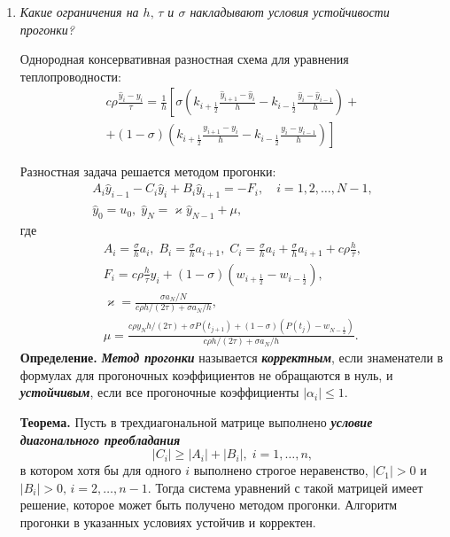 \documentclass[12pt, a4paper]{article}
\begin{document}
\begin{enumerate}

		
		\item \textit{Какие ограничения на $h,\,\tau$ и $\sigma$ накладывают условия устойчивости прогонки?}
		\smallskip
		
		Однородная консервативная разностная схема для уравнения теплопроводности:
		\begin{multline*}
			c\rho \frac{\hat y_i-y_i}{\tau}=\frac1{h}\left[\sigma\left(\hat k_{i+\frac12}\frac{\hat y_{i+1}-\hat y_i}{h}-k_{i-\frac12}\frac{\hat y_{i}-\hat y_{i-1}}{h}\right)+\right.\\
			+ \left.(1-\sigma)\left( k_{i+\frac12}\frac{y_{i+1}-y_i}{h}-k_{i-\frac12}\frac{y_{i}-y_{i-1}}{h}\right)\right]
		\end{multline*}
		
		Разностная задача решается методом прогонки:
		\begin{gather*}
			A_i \hat y_{i-1}-C_i \hat y_i+B_i \hat y_{i+1}=-F_i,\quad i=1,2,\dots,N-1,\\
			\hat y_0 = u_0,\;\hat y_N=\varkappa \hat y_{N-1}+\mu,
		\end{gather*}
		где
		\begin{gather*}
			A_i=\frac{\sigma}{h}a_i,\;	B_i=\frac{\sigma}{h}a_{i+1},\;C_i=\frac{\sigma}{h}a_i+\frac{\sigma}{h}a_{i+1}+c\rho\frac{h}{\tau},\\
			F_i=c\rho\frac{h}{\tau}y_i+(1-\sigma)(w_{i+\frac12}-w_{i-\frac12}),\\
			\varkappa = \frac{\sigma a_N/N}{c\rho h/(2\tau)+\sigma a_N/h},\\
			\mu=\frac{c\rho y_N h/(2\tau)+\sigma P(t_{j+1})+(1-\sigma)(P(t_j)-w_{N-\frac12})}{c\rho h /(2\tau)+\sigma a_N/h}.
		\end{gather*}
		\textbf{Определение.} \textbf{\textit{Метод прогонки}} называется \textbf{\textit{корректным}}, если знаменатели в формулах для прогоночных коэффициентов не обращаются в нуль, и \textbf{\textit{устойчивым}}, если все прогоночные коэффициенты $|\alpha_i|\le 1.$	
		
		\textbf{Теорема.} Пусть в трехдиагональной матрице выполнено \textbf{\textit{условие диагонального преобладания}}
		\[
		|C_i|\ge|A_i|+|B_i|,\; i=1,\dots,n,
		\]
		в котором хотя бы для одного $i$ выполнено строгое неравенство, $|C_1|>0$ и $|B_i|>0,\,i=2,\dots,n-1$. Тогда система уравнений с такой матрицей имеет решение, которое может быть получено методом прогонки. Алгоритм прогонки в указанных условиях устойчив и корректен.
		

\end{enumerate}
\end{document}
